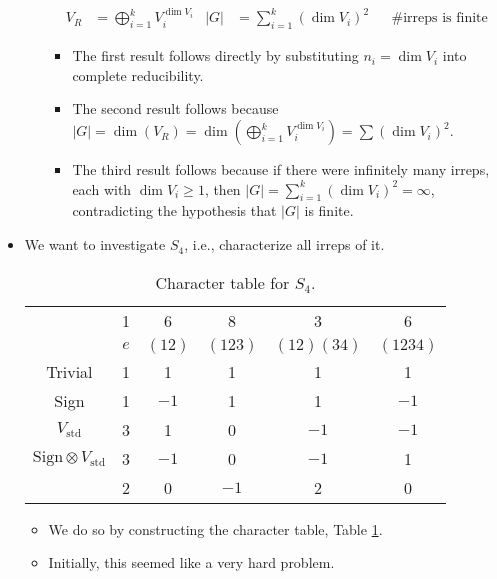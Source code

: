 \documentclass[../notes.tex]{subfiles}
\begin{document}
\begin{itemize}
\begin{itemize}
        \begin{align*}
            V_R &= \bigoplus_{i=1}^kV_i^{\dim V_i}&
            |G| &= \sum_{i=1}^k(\dim V_i)^2&
            &\text{\# irreps is finite}
        \end{align*}
        \begin{itemize}
            \item The first result follows directly by substituting $n_i=\dim V_i$ into complete reducibility.
            \item The second result follows because $|G|=\dim(V_R)=\dim(\bigoplus_{i=1}^kV_i^{\dim V_i})=\sum(\dim V_i)^2$.
            \item The third result follows because if there were infinitely many irreps, each with $\dim V_i\geq 1$, then $|G|=\sum_{i=1}^k(\dim V_i)^2=\infty$, contradicting the hypothesis that $|G|$ is finite.
        \end{itemize}
    \end{itemize}
    \item We want to investigate $S_4$, i.e., characterize all irreps of it.
    \begin{table}[h!]
        \centering
        \small
        \renewcommand{\arraystretch}{1.2}
        \begin{tabular}{c|c|c|c|c|c|}
             & 1 & 6 & 8 & 3 & 6\\
             & $e$ & $(12)$ & $(123)$ & $(12)(34)$ & $(1234)$\\ \hline
            Trivial & 1 & 1 & 1 & 1 & 1\\ \hline
            Sign & 1 & $-1$ & 1 & 1 & $-1$\\ \hline
            $V_\text{std}$ & 3 & 1 & 0 & $-1$ & $-1$\\ \hline
            $\text{Sign}\otimes V_\text{std}$ & 3 & $-1$ & 0 & $-1$ & 1\\ \hline
             & 2 & 0 & $-1$ & 2 & 0\\
        \end{tabular}
        \caption{Character table for $S_4$.}
        \label{tab:charTableS4}
    \end{table}
    \begin{itemize}
        \item We do so by constructing the character table, Table \ref{tab:charTableS4}.
        \item Initially, this seemed like a very hard problem.

\end{itemize}
\end{itemize}
\end{document}
